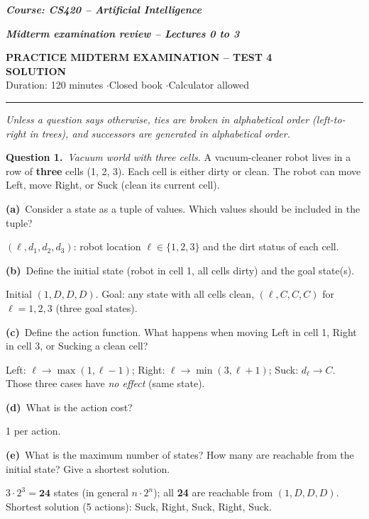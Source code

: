 \documentclass[11pt,a4paper]{article}
\newcommand{\question}[1]{\par\medskip\noindent\textbf{Question #1.}\ }
\newcommand{\subq}[1]{\par\smallskip\noindent\textbf{#1}\ }
\begin{document}
{\large\textbf{\textit{Course: CS420 -- Artificial Intelligence}}}\par
{\textbf{\textit{Midterm examination review -- Lectures 0 to 3}}}\par
\begin{center}{\Large\bfseries PRACTICE MIDTERM EXAMINATION -- TEST 4\\[2pt]\textcolor{blue!55!black}{SOLUTION}}\\[3pt]
{\small Duration: 120 minutes \quad$\cdot$\quad Closed book \quad$\cdot$\quad Calculator allowed}\end{center}
\noindent\rule{\linewidth}{0.6pt}

{\small\textit{Unless a question says otherwise, ties are broken in alphabetical order (left-to-right in trees), and successors are generated in alphabetical order.}}\par
\question{1}\textit{Vacuum world with three cells.} A vacuum-cleaner robot lives in a row of \textbf{three} cells (1, 2, 3). Each cell is either dirty or clean. The robot can move Left, move Right, or Suck (clean its current cell).
\subq{(a)}Consider a state as a tuple of values. Which values should be included in the tuple?
\begin{solbox}
$(\ell, d_1, d_2, d_3)$: robot location $\ell\in\{1,2,3\}$ and the dirt status of each cell.
\end{solbox}
\subq{(b)}Define the initial state (robot in cell 1, all cells dirty) and the goal state(s).
\begin{solbox}
Initial $(1,D,D,D)$. Goal: any state with all cells clean, $(\ell,C,C,C)$ for $\ell=1,2,3$ (three goal states).
\end{solbox}
\subq{(c)}Define the action function. What happens when moving Left in cell 1, Right in cell 3, or Sucking a clean cell?
\begin{solbox}
Left: $\ell\to\max(1,\ell-1)$; Right: $\ell\to\min(3,\ell+1)$; Suck: $d_\ell\to C$. Those three cases have \emph{no effect} (same state).
\end{solbox}
\subq{(d)}What is the action cost?
\begin{solbox}
1 per action.
\end{solbox}
\subq{(e)}What is the maximum number of states? How many are reachable from the initial state? Give a shortest solution.
\begin{solbox}
$3\cdot2^3=\mathbf{24}$ states (in general $n\cdot2^n$); all \textbf{24} are reachable from $(1,D,D,D)$. Shortest solution (5 actions): Suck, Right, Suck, Right, Suck.
\end{solbox}
\end{document}
